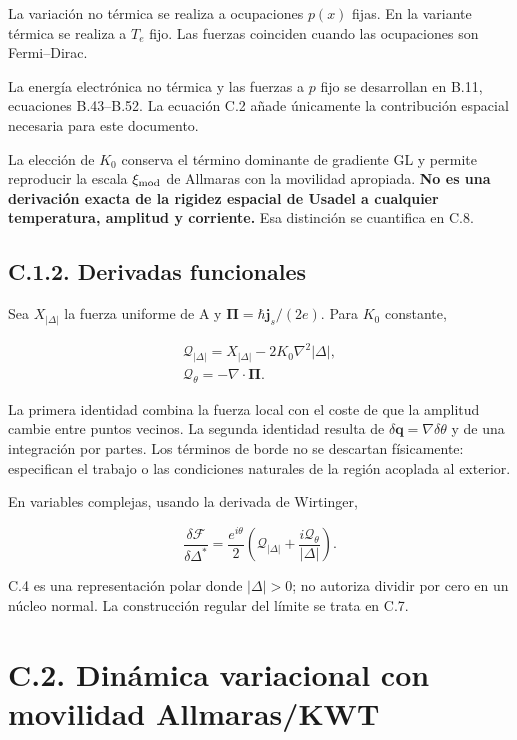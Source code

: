 \documentclass[
  spanish,
  10pt,
  a4paper,
]{article}
\begin{document}
La variación no térmica se realiza a ocupaciones \(p(x)\) fijas. En la
variante térmica se realiza a \(T_e\) fijo. Las fuerzas coinciden cuando
las ocupaciones son Fermi--Dirac.

La energía electrónica no térmica y las fuerzas a \(p\) fijo se
desarrollan en B.11, ecuaciones B.43--B.52. La ecuación C.2 añade
únicamente la contribución espacial necesaria para este documento.

La elección de \(K_0\) conserva el término dominante de gradiente GL y
permite reproducir la escala \(\xi_{\rm mod}\) de Allmaras con la
movilidad apropiada. \textbf{No es una derivación exacta de la rigidez
espacial de Usadel a cualquier temperatura, amplitud y corriente.} Esa
distinción se cuantifica en C.8.

\subsection{C.1.2. Derivadas
funcionales}\label{c.1.2.-derivadas-funcionales}

Sea \(X_{|\Delta|}\) la fuerza uniforme de A y
\(\boldsymbol\Pi=\hbar\mathbf j_s/(2e)\). Para \(K_0\) constante,

\[
\begin{gathered}
\mathcal Q_{|\Delta|}=X_{|\Delta|}-2K_0\nabla^2|\Delta|,\\
\mathcal Q_\theta=-\nabla\cdot\boldsymbol\Pi.
\end{gathered} \tag{C.3}
\]

La primera identidad combina la fuerza local con el coste de que la
amplitud cambie entre puntos vecinos. La segunda identidad resulta de
\(\delta\mathbf q=\nabla\delta\theta\) y de una integración por partes.
Los términos de borde no se descartan físicamente: especifican el
trabajo o las condiciones naturales de la región acoplada al exterior.

En variables complejas, usando la derivada de Wirtinger,

\[
\frac{\delta\mathcal F}{\delta\Delta^*}
=\frac{e^{i\theta}}2\left(\mathcal Q_{|\Delta|}+
\frac{i\mathcal Q_\theta}{|\Delta|}\right). \tag{C.4}
\]

C.4 es una representación polar donde \(|\Delta|>0\); no autoriza
dividir por cero en un núcleo normal. La construcción regular del límite
se trata en C.7.

\section{C.2. Dinámica variacional con movilidad
Allmaras/KWT}\label{c.2.-dinuxe1mica-variacional-con-movilidad-allmaraskwt}
\end{document}
